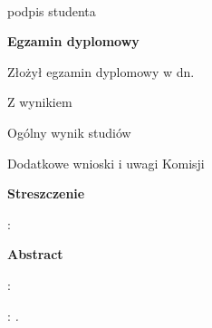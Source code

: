 \begin{titlepage}
    \par
    \vspace{2\baselineskip}
    \hfill\parbox{15em}{{\small\dotfill}\\[-.3ex]
    \centerline{\footnotesize podpis studenta}}\par
    \vspace{1\baselineskip}
    \begin{center}
 	{\large\bfseries Egzamin dyplomowy} \par\bigskip\bigskip
    \end{center}
    \par\noindent\vspace{1.0\baselineskip}
    Złożył egzamin dyplomowy w dn. \dotfill
    \par\noindent\vspace{1.0\baselineskip}
    Z wynikiem \dotfill
    \par\noindent\vspace{1.0\baselineskip}
    Ogólny wynik studiów \dotfill
    \par\noindent\vspace{1.0\baselineskip}
    Dodatkowe wnioski i uwagi Komisji \dotfill
    \par\noindent\vspace{1.0\baselineskip}
    \dotfill

    \newpage\thispagestyle{empty}
    \vspace*{2\baselineskip}
    \begin{center}
	{\large\bfseries Streszczenie}\par\bigskip
	\vspace*{2\baselineskip}
    \end{center}

    \itshape
    \vspace*{3\baselineskip}

    : {\itshape {}}
    
    \newpage\thispagestyle{empty}
    \vspace*{2\baselineskip}
    \begin{center}
	{\large\bfseries Abstract}\par\bigskip
	\vspace*{2\baselineskip}
    \end{center}
    : {\itshape {}}\par
    \vspace*{1\baselineskip}
    \itshape
    \vspace*{3\baselineskip}

    : {\itshape {}.}

\end{titlepage}

